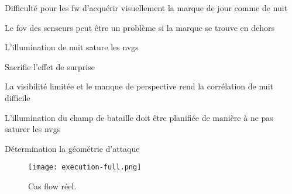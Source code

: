 \begin{e1}
\begin{e2}
\begin{e3}
\begin{e4}
\begin{e5}
\begin{e6}
						\item Difficulté pour les \gls{fw} d'acquérir visuellement la marque de jour comme de nuit
						\item Le \gls{fov} des senseurs peut être un problème si la marque se trouve en dehors
						\item L'illumination de nuit sature les \glspl{nvg}
						\item Sacrifie l'effet de surprise
					\end{e6}
				\end{e5}
				\begin{e5}
					\item La visibilité limitée et le manque de perspective rend la corrélation de nuit difficile
					\item L'illumination du champ de bataille doit être planifiée de manière à ne pas saturer les \glspl{nvg}
				\end{e5}
			\end{e4}
	   	\end{e3}
	\end{e2}
	\item Détermination la géométrie d'attaque 
\end{e1}
	\begin{figure}[H]
		\texttt{[image: execution-full.png]}
		\caption{Cas flow réel.}
		\label{fig:casflow-full}
	\end{figure}
